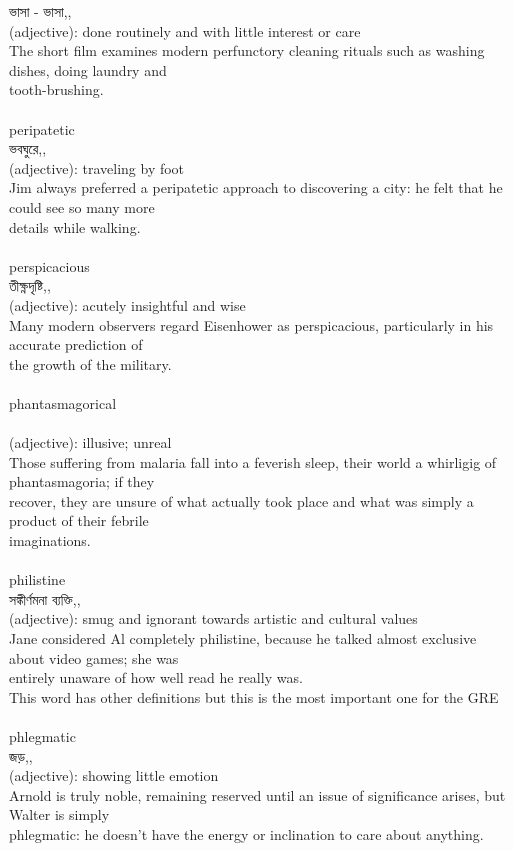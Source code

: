 \documentclass{article}
\begin{document}
{{ভাসা - ভাসা,,}\\
{(adjective): done routinely and with little interest or care\\The short film examines modern perfunctory cleaning rituals such as washing dishes, doing laundry and\\tooth-brushing.\\}\\
{peripatetic}\\
{ভবঘুরে,,}\\
{(adjective): traveling by foot\\Jim always preferred a peripatetic approach to discovering a city: he felt that he could see so many more\\details while walking.\\}\\
{perspicacious}\\
{তীক্ষ্নদৃষ্টি,,}\\
{(adjective): acutely insightful and wise\\Many modern observers regard Eisenhower as perspicacious, particularly in his accurate prediction of\\the growth of the military.\\}\\
{phantasmagorical}\\
{}\\
{(adjective): illusive; unreal\\Those suffering from malaria fall into a feverish sleep, their world a whirligig of phantasmagoria; if they\\recover, they are unsure of what actually took place and what was simply a product of their febrile\\imaginations.\\}\\
{philistine}\\
{সঙ্কীর্ণমনা ব্যক্তি,,}\\
{(adjective): smug and ignorant towards artistic and cultural values\\Jane considered Al completely philistine, because he talked almost exclusive about video games; she was\\entirely unaware of how well read he really was.\\This word has other definitions but this is the most important one for the GRE\\}\\
{phlegmatic}\\
{জড়,,}\\
{(adjective): showing little emotion\\Arnold is truly noble, remaining reserved until an issue of significance arises, but Walter is simply\\phlegmatic: he doesn't have the energy or inclination to care about anything.\\}\\
}
\end{document}
